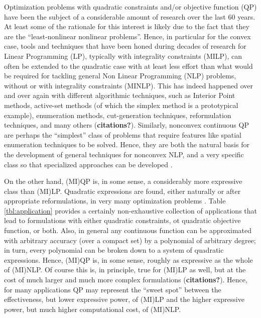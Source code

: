Optimization problems with quadratic constraints and/or objective function (QP) have been the subject of a considerable amount of research over the last 60 years. At least some of the rationale for this interest is likely due to the fact that they are the ``least-nonlinear nonlinear problems''. Hence, in particular for the convex case, tools and techniques that have been honed during decades of research for Linear Programming (LP), typically with integrality constraints (MILP), can often be extended to the quadratic case with at least less effort than what would be required for tackling general Non Linear Programming (NLP) problems, without or with integrality constraints (MINLP). This has indeed happened over and over again with different algorithmic techniques, such as Interior Point methods, active-set methods (of which the simplex method is a prototypical example), enumeration methods, cut-generation techniques, reformulation techniques, and many others ({\bf citations?}). Similarly, nonconvex continuous QP are perhaps the ``simplest'' class of problems that require features like spatial enumeration techniques to be solved. Hence, they are both the natural basis for the development of general techniques for nonconvex NLP, and a very specific class so that specialized approaches can be developed \cite{Dur2010,Burer2012}.

On the other hand, (MI)QP is, in some sense, a considerably more expressive class than (MI)LP. Quadratic expressions are found, either naturally or after appropriate reformulations, in very many optimization problems \cite{Kochenberger2014}. Table \ref{tbl:application} provides a certainly non-exhaustive collection of applications that lead to formulations with either quadratic constraints, ot quadratic objective function, or both. Also, in general any continuous function can be approximated with arbitrary accuracy (over a compact set) by a polynomial of arbitrary degree; in turn, every polynomial can be broken down to a system of quadratic expressions. Hence, (MI)QP is, in some sense, roughly as expressive as the whole of (MI)NLP. Of course this is, in principle, true for (MI)LP as well, but at the cost of much larger and much more complex formulations ({\bf citations?}). Hence, for many applications QP may represent the ``sweet spot'' between the effectiveness, but lower expressive power, of (MI)LP and the higher expressive power, but much higher computational cost, of (MI)NLP.

